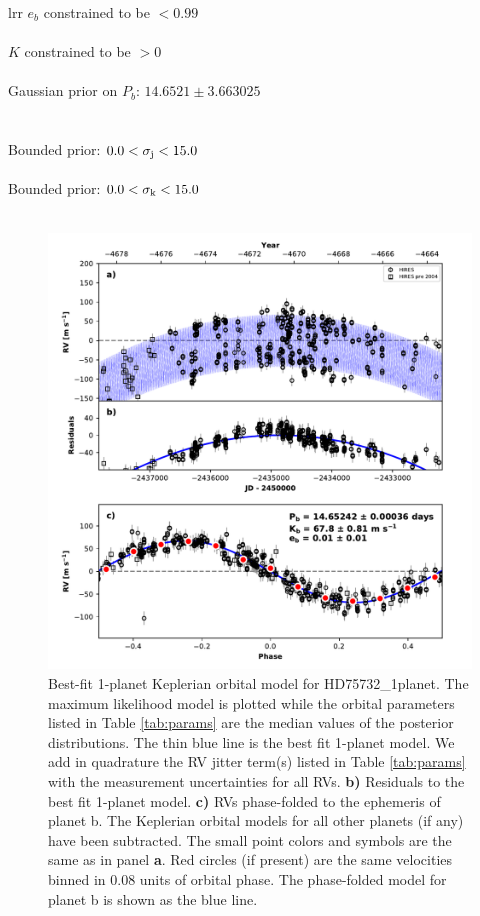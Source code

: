 \documentclass{emulateapj}
\begin{document}
\begin{deluxetable}{lrr}
\tablehead{}
\startdata
$e_{b}$ constrained to be $<0.99$ \\\\
$K$ constrained to be $>0$\\\\
Gaussian prior on $P_{b}$: $14.6521 \pm 3.663025$ \\\\\\
Bounded prior: $0.0 < \sigma_{\rm j} < 15.0$\\\\
Bounded prior: $0.0 < \sigma_{\rm k} < 15.0$\\\\

\enddata
\end{deluxetable}


\begin{figure}[!h]
\centering
\includegraphics[width=6.5in]{HD75732_1planet_rv_multipanel.pdf}
\caption{
Best-fit 1-planet Keplerian orbital model for HD75732\_1planet.
The maximum likelihood model is plotted while the orbital parameters listed in Table \ref{tab:params}
are the median values of the posterior distributions.
The thin blue line is the best fit 1-planet model. We add in quadrature the RV jitter term(s) listed in Table \ref{tab:params}
with the measurement uncertainties for all RVs.
{\bf b)} Residuals to the best fit 1-planet model.
{\bf c)} RVs phase-folded to the ephemeris of planet b. The Keplerian orbital models for all other planets (if any) have been subtracted.
The small point colors and symbols are the same as in panel {\bf a}.
Red circles (if present) are the same velocities binned in 0.08 units of orbital phase.
The phase-folded model for planet b is shown as the blue line.
}
\end{figure}
\end{document}
